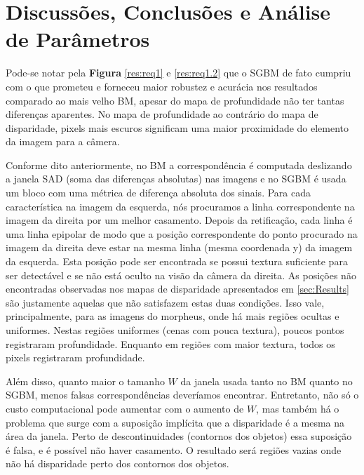 \documentclass{bmvc2k}
\begin{document}
\section{Discussões, Conclusões e Análise de Parâmetros}
\label{sec:Conclusion}
Pode-se notar pela \textbf{Figura} \ref{res:req1} e \ref{res:req1.2} que o SGBM de fato cumpriu com o que prometeu e forneceu maior robustez e acurácia nos resultados comparado ao mais velho BM, apesar do mapa de profundidade não ter tantas diferenças aparentes. No mapa de profundidade ao contrário do mapa de disparidade, pixels mais escuros significam uma maior proximidade do elemento da imagem para a câmera.

Conforme dito anteriormente, no BM a correspondência é computada deslizando a janela SAD (soma das diferenças absolutas) nas imagens e no SGBM é usada um bloco com uma métrica de diferença absoluta dos sinais. Para cada característica na imagem da esquerda, nós procuramos a linha correspondente na imagem da direita por um melhor casamento. Depois da retificação, cada linha é uma linha epipolar de modo que a posição correspondente do ponto procurado na imagem da direita deve estar na mesma linha (mesma coordenada y) da imagem da esquerda. Esta posição pode ser encontrada se possui textura suficiente para ser detectável e se não está oculto na visão da câmera da direita. As posições não encontradas observadas nos mapas de disparidade apresentados em \ref{sec:Results} são justamente aquelas que não satisfazem estas duas condições. Isso vale, principalmente, para as imagens do morpheus, onde há mais regiões ocultas e uniformes. Nestas regiões uniformes (cenas com pouca textura), poucos pontos registraram profundidade. Enquanto em regiões com maior textura, todos os pixels registraram profundidade.

Além disso, quanto maior o tamanho $W$ da janela usada tanto no BM quanto no SGBM, menos falsas correspondências deveríamos encontrar. Entretanto, não só o custo computacional pode aumentar com o aumento de $W$, mas também há o problema que surge com a suposição implícita que a disparidade é a mesma na área da janela. Perto de descontinuidades (contornos dos objetos) essa suposição é falsa, e é possível não haver casamento. O resultado será regiões vazias onde não há disparidade perto dos contornos dos objetos. 

\end{document}
